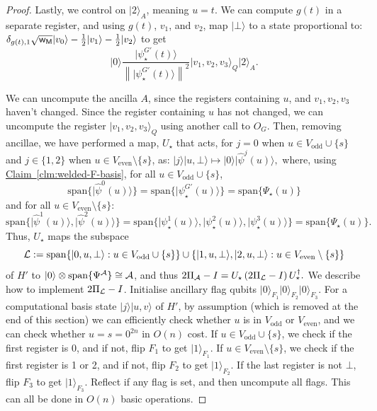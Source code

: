 \documentclass{theoretics}
\newcommand{\clm}[1]{\hyperref[clm:#1]{Claim~\ref*{clm:#1}}}
\def\ket#1{{\lvert}#1\rangle}
\renewcommand{\>}{\rangle}
\newcommand{\<}{\langle}
\renewcommand{\(}{\left(}
\renewcommand{\)}{\right)}
\def\norm#1{\left\| #1 \right\|}
\def\w{{\sf w}}
\begin{document}
\begin{proof}
Lastly, we control on $\ket{2}_A$, meaning $u=t$. We can compute $g(t)$ in a separate register, and using $g(t)$, $v_1$, and $v_2$, map $\ket{\bot}$ to a state proportional to:
$\delta_{g(t),1}\sqrt{\w_{\sf M}}\ket{v_0}-\frac{1}{2}\ket{v_1}-\frac{1}{2}\ket{v_2}$
to get
$$\ket{0}\frac{\ket{{\psi}^{G'}_\star(t)}}{\norm{\ket{{\psi}^{G'}_\star(t)}}^2}\ket{v_1,v_2,v_3}_Q\ket{2}_A.$$

We can uncompute the ancilla $A$, since the registers containing $u$, and $v_1,v_2,v_3$ haven't changed.
Since the register containing $u$ has not changed, we can uncompute the register $\ket{v_1,v_2,v_3}_Q$ using another call to $O_G$. Then, removing ancillae, we have performed a map, $U_\star$ that acts, for $j=0$ when $u\in V_{\mathrm{odd}}\cup\{s\}$ and $j\in\{1,2\}$ when $u\in V_{\mathrm{even}}\setminus\{s\}$, as:
$\ket{j}\ket{u,\bot}\mapsto \ket{0}\ket{\widehat{\psi}^j(u)},$
where, using \clm{welded-F-basis}, for all $u\in V_{\mathrm{odd}}\cup\{s\}$,
$$\mathrm{span}\{\ket{\widehat{\psi}^0(u)}\}=\mathrm{span}\{\ket{\psi_\star^{G'}(u)}\}=\mathrm{span}\{\Psi_\star(u)\}$$
and for all $u\in V_{\mathrm{even}}\setminus \{s\}$:
$$\mathrm{span}\{\ket{\widehat{\psi}^1(u)},\ket{\widehat{\psi}^2(u)}\}=\mathrm{span}\{\ket{\psi_\star^1(u)},\ket{\psi_\star^2(u)},\ket{\psi_\star^3(u)}\}=\mathrm{span}\{\Psi_\star(u)\}.$$
Thus, $U_\star$ maps the subspace
$${\cal L}:=\mathrm{span}\{\ket{0,u,\bot}:u\in V_{\mathrm{odd}}\cup\{s\}\}\cup\{\ket{1,u,\bot},\ket{2,u,\bot}:u\in V_{\mathrm{even}}\setminus\{s\}\}$$
of $H'$ to $\ket{0}\otimes \mathrm{span}\{\Psi^{\cal A}\}\cong {\cal A}$, and thus 
$2\Pi_{\cal A}-I = U_\star \left(2\Pi_{\cal L}  -I\right) U_\star^\dagger.$
We describe how to implement $2\Pi_{\cal L}-I$. Initialise ancillary flag qubits $\ket{0}_{F_1}\ket{0}_{F_2}\ket{0}_{F_3}$. For a computational basis state $\ket{j}\ket{u,v}$ of $H'$, by assumption (which is removed at the end of this section) we can efficiently check whether $u$ is in $V_{\mathrm{odd}}$ or $V_{\mathrm{even}}$, and we can check whether $u=s=0^{2n}$ in $O(n)$ cost. If $u\in V_{\mathrm{odd}}\cup\{s\}$, we check if the first register is 0, and if not, flip $F_1$ to get $\ket{1}_{F_1}$. If $u\in V_{\mathrm{even}}\setminus \{s\}$, we check if the first register is 1 or 2, and if not, flip $F_2$ to get $\ket{1}_{F_2}$. If the last register is not $\bot$, flip $F_3$ to get $\ket{1}_{F_3}$. Reflect if any flag is set, and then uncompute all flags. This can all be done in $O(n)$ basic operations.


\end{proof}
\end{document}
